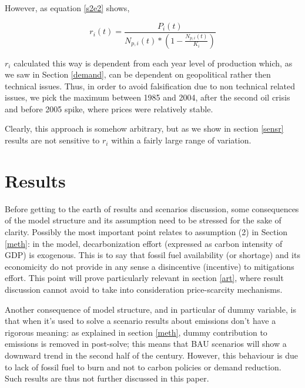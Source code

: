\documentclass[11pt]{article} %
\begin{document}
However, as equation \ref{s2e2} shows,

\begin{equation}
r_i(t) = \frac {P_i(t)} {N_{p,i}(t)*(1 - \frac{N_{p,i}(t)}{K_i})}
\label{s2e2}
\end{equation}

 $r_i$ calculated this way is dependent from each year level of production which, as we saw in Section \ref{demand}, can be dependent on geopolitical rather then technical issues. Thus, in order to avoid falsification due to non technical related issues, we pick the maximum  between 1985 and 2004, after the second oil crisis and before 2005 spike, where prices were relatively stable.

Clearly, this approach is somehow arbitrary, but as we show in section \ref{sensr} results are not sensitive to $r_i$ within a fairly large range of variation.

\section{Results} \label{res} 

Before getting to the earth of results and scenarios discussion, some consequences of the model structure and its assumption need to be stressed for the sake of clarity. Possibly the most important point relates to assumption (2) in Section \ref{meth}: in the model, decarbonization effort (expressed as carbon intensity of GDP) is exogenous. This is to say that fossil fuel availability (or shortage) and its economicity do not provide in any sense a disincentive (incentive) to mitigations effort. This point will prove particularly relevant in section \ref{art}, where result discussion cannot avoid to take into consideration price-scarcity mechanisms.

Another consequence of model structure, and in particular of dummy variable, is that when it's used to solve a scenario results about emissions don't have a rigorous meaning: as explained in section \ref{meth}, dummy  contribution to emissions is removed in post-solve; this means that BAU scenarios will show a downward trend in the second half of the century. However, this behaviour is due to lack of fossil fuel to burn and not to carbon policies or demand reduction. Such results are thus not further discussed in this paper. 
\end{document}
